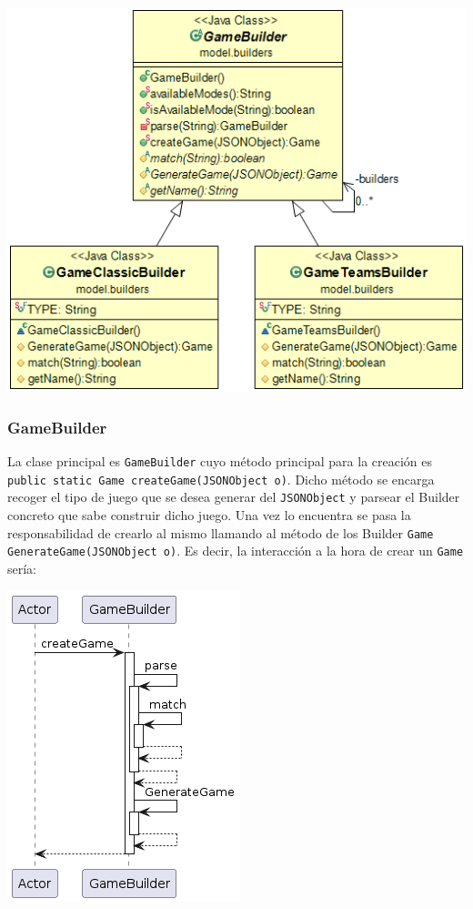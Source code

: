 \documentclass[../DocumentoOficial.tex]{subfiles}
\begin{document}
\begin{center}
\includegraphics[scale=0.7]{Builders_final_class.png}
\end{center}

\subsubsection{GameBuilder}
La clase principal es \texttt{GameBuilder} cuyo método principal para la creación es \texttt{public static Game createGame(JSONObject o)}. Dicho método se encarga recoger el tipo de juego que se desea generar del \texttt{JSONObject} y parsear el Builder concreto que sabe construir dicho juego. Una vez lo encuentra se pasa la responsabilidad de crearlo al mismo llamando al método de los Builder \texttt{Game GenerateGame(JSONObject o)}. Es decir, la interacción a la hora de crear un \texttt{Game} sería:
\begin{center}
\includegraphics[scale=0.55]{Builders_final_seq}
\end{center}
\end{document}
